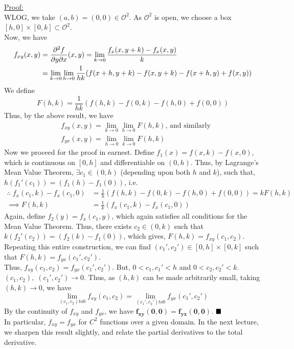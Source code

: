 \documentclass[../Analysis-3]{subfiles}
\begin{document}
\underline{Proof:}\\
WLOG, we take $(a,b) = (0,0) \in \mathcal{O}^2$. As $\mathcal{O}^2$ is open, we choose a box $[h,0]\times [0,k] \subset \mathcal{O}^2$.\\
Now, we have
\begin{align*}
    f_{xy}(x,y) &= \pdv{f}{y}{x}\/(x,y) = \lim_{k \to 0} \frac{f_x(x,y+k) - f_x(x,y)}{k} \\
                        &= \lim_{k \to 0} \lim_{h \to 0} \frac{1}{hk}(f(x+h,y+k) - f(x,y+k) - f(x+h,y)+ f(x,y)) 
\end{align*}
We define 
\[F(h,k) = \frac{1}{hk}(f(h,k) - f(0,k) - f(h,0)+ f(0,0))\]
Thus, by the above result, we have
\begin{align*}
    &f_{xy}(x,y) = \lim_{k \to 0} \lim_{h \to 0} F(h,k) \text{, and similarly}\\ &f_{yx}(x,y) = \lim_{h \to 0} \lim_{k \to 0} F(h,k)
\end{align*}
Now we proceed for the proof in earnest. Define $f_1(x) = f(x,k) - f(x,0)$, which is continuous on $[0,h]$ and differentiable on $(0,h)$. Thus, by Lagrange's Mean Value Theorem, $\exists c_1 \in (0,h)$ (depending upon both $h$ and $k$), such that, $h(f_1'(c_1)) = (f_1(h) - f_1(0))$, i.e.
\begin{align*}
    \therefore\; f_x(c_1,k) - f_x(c_1,0) &=  \frac{1}{h}(f(h,k) - f(0,k) - f(h,0)+ f(0,0)) = kF(h,k)\\
    \implies F(h,k) &= \frac{1}{k}(f_x(c_1,k) - f_x(c_1,0))
\end{align*}
Again, define $f_2(y) = f_x(c_1,y)$, which again satisfies all conditions for the Mean Value Theorem. Thus, there exists $c_2 \in (0,k)$ such that $k(f_2'(c_2)) = (f_2(k) - f_1(0))$, which gives, $F(h,k) = f_{xy}(c_1, c_2)$.\\
Repeating this entire construction, we can find $(c_1', c_2') \in [0,h]\times[0,k]$ such that $F(h,k) = f_{yx}(c_1', c_2')$.\\
Thus, $f_{xy}(c_1, c_2) = f_{yx}(c_1', c_2')$. But, $0 < c_1, c_1' < h$ and $0 < c_2, c_2' < k$. $(c_1, c_2),\;(c_1', c_2') \to 0$. Thus, as $(h,k)$ can be made arbitrarily small, taking  $(h,k) \to 0$, we have
\[
    \lim_{(c_1, c_2) to 0} f_{xy}(c_1, c_2) = \lim_{(c_1', c_2') to 0} f_{yx}(c_1', c_2')
\]
By the continuity of $f_{xy}$ and $f_{yx}$, we have $\mathbf{f_{xy}(0,0) = f_{yx}(0,0)}$. $\hfill\blacksquare$\\[0.4 cm]
In particular, $f_{xy} = f_{yx}$ for $C^2$ functions over a given domain. In the next lecture, we sharpen this result slightly, and relate the  partial derivatives to the total derivative.
\end{document}
